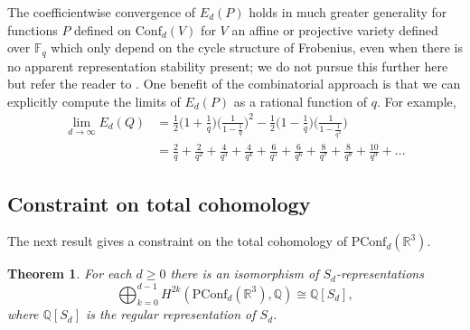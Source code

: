 \documentclass[submission]{FPSAC2018}
\newtheorem{thm}{Theorem}[section]
\theoremstyle{definition}
\numberwithin{equation}{section}
\def\QQ{\mathbb{Q}}
\def\FF{\mathbb{F}}
\def\RR{\mathbb{R}}
\def\Conf{\mathrm{Conf}}
\newcommand\PConf{\mathrm{PConf}}
\begin{document}
The coefficientwise convergence of $E_d(P)$ holds in much greater generality for functions $P$ defined on $\Conf_d(V)$ for $V$ an affine or projective variety defined over $\FF_q$ which only depend on the cycle structure of Frobenius, even when there is no apparent representation stability present; we do not pursue this further here but refer the reader to \cite[Cor. 10]{Chen}. One benefit of the combinatorial approach is that we can explicitly compute the limits of $E_d(P)$ as a rational function of $q$. For example,
\begin{align*}
    \lim_{d\rightarrow\infty}E_d(Q) &= \frac{1}{2}\bigg(1 + \frac{1}{q}\bigg)\bigg(\frac{1}{1 - \frac{1}{q}}\bigg)^2 - \frac{1}{2}\bigg(1 - \frac{1}{q}\bigg)\bigg(\frac{1}{1 - \frac{1}{q^2}}\bigg)\\
    &= \frac{2}{q} + \frac{2}{q^2} + \frac{4}{q^3} + \frac{4}{q^4} + \frac{6}{q^5} + \frac{6}{q^6} + \frac{8}{q^7} + \frac{8}{q^8} + \frac{10}{q^9} + \ldots
\end{align*}


\subsection{Constraint on total cohomology}
The next result gives a constraint on the total cohomology of $\PConf_d(\RR^3)$.
\begin{thm}
\label{thm constraint}
For each $d\geq 0$ there is an isomorphism of $S_d$-representations
\begin{equation}
\label{eqn cohom}
    \bigoplus_{k=0}^{d-1}H^{2k}(\PConf_d(\RR^3),\QQ) \cong \QQ[S_d],
\end{equation}
where $\QQ[S_d]$ is the regular representation of $S_d$.
\end{thm}
\end{document}

